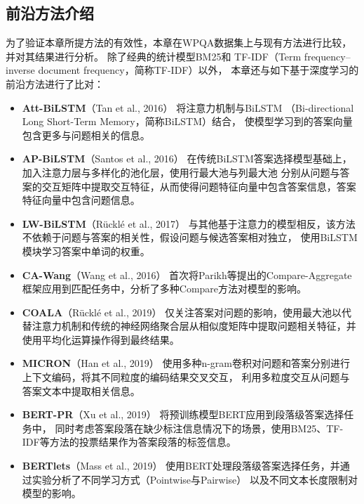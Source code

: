 \subsection{前沿方法介绍}

为了验证本章所提方法的有效性，本章在WPQA数据集上与现有方法进行比较，并对其结果进行分析。
除了经典的统计模型BM25\cite{robertson1994some}和
TF-IDF（Term frequency–inverse document frequency，简称TF-IDF）\cite{ramos2003using}以外，
本章还与如下基于深度学习的前沿方法进行了比对：
\begin{itemize}
    \item \textbf{Att-BiLSTM}（Tan et al., 2016）\cite{tan2016improved}
    将注意力机制与BiLSTM （Bi-directional Long Short-Term Memory，简称BiLSTM）结合，
    使模型学习到的答案向量包含更多与问题相关的信息。
    \item \textbf{AP-BiLSTM}（Santos et al., 2016）\cite{santos2016attentive}
    在传统BiLSTM答案选择模型基础上，加入注意力层与多样化的池化层，使用行最大池与列最大池
    分别从问题与答案的交互矩阵中提取交互特征，从而使得问题特征向量中包含答案信息，答案特征向量中包含问题信息。
    \item \textbf{LW-BiLSTM}（Rücklé et al., 2017）\cite{ruckle2017representation}
    与其他基于注意力的模型相反，该方法不依赖于问题与答案的相关性，假设问题与候选答案相对独立，
    使用BiLSTM模块学习答案中单词的权重。
    \item \textbf{CA-Wang}（Wang et al., 2016）\cite{parikh2016decomposable}
    首次将Parikh等提出的Compare-Aggregate框架应用到匹配任务中，分析了多种Compare方法对模型的影响。
    \item \textbf{COALA}（Rücklé et al., 2019）\cite{ruckle2019coala}
    仅关注答案对问题的影响，使用最大池以代替注意力机制和传统的神经网络聚合层从相似度矩阵中提取问题相关特征，并使用平均化运算操作得到最终结果。
    \item \textbf{MICRON}（Han et al., 2019）\cite{han2019micron}
    使用多种n-gram卷积对问题和答案分别进行上下文编码，将其不同粒度的编码结果交叉交互，
    利用多粒度交互从问题与答案文本中提取相关信息。
    \item \textbf{BERT-PR}（Xu et al., 2019）\cite{xu2019passage}
    将预训练模型BERT应用到段落级答案选择任务中，
    同时考虑答案段落在缺少标注信息情况下的场景，使用BM25、TF-IDF等方法的投票结果作为答案段落的标签信息。
    \item \textbf{BERTlets}（Mass et al., 2019）\cite{mass2019study}
    使用BERT处理段落级答案选择任务，并通过实验分析了不同学习方式（Pointwise与Pairwise）
    以及不同文本长度限制对模型的影响。
\end{itemize}

